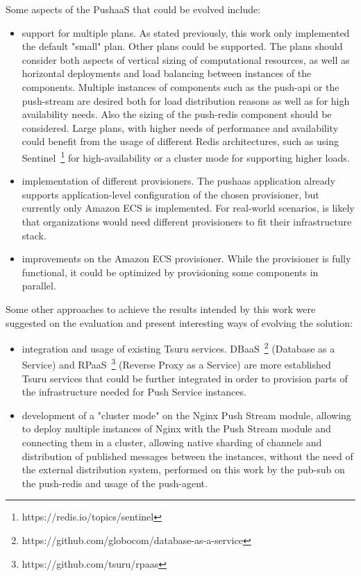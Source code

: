 Some aspects of the PushaaS that could be evolved include:
\begin{itemize}
    \item support for multiple plans. As stated previously, this work only implemented the default "small" plan. Other plans could be supported. The plans should consider both aspects of vertical sizing of computational resources, as well as horizontal deployments and load balancing between instances of the components. Multiple instances of components such as the push-api or the push-stream are desired both for load distribution reasons as well as for high availability needs. Also the sizing of the push-redis component should be considered. Large plans, with higher needs of performance and availability could benefit from the usage of different Redis architectures, such as using Sentinel~\footnote{https://redis.io/topics/sentinel} for high-availability or a cluster mode for supporting higher loads.
    \item implementation of different provisioners. The pushaas application already supports application-level configuration of the chosen provisioner, but currently only Amazon ECS is implemented. For real-world scenarios, is likely that organizations would need different provisioners to fit their infrastructure stack.
    \item improvements on the Amazon ECS provisioner. While the provisioner is fully functional, it could be optimized by provisioning some components in parallel.
\end{itemize}

Some other approaches to achieve the results intended by this work were suggested on the evaluation and present interesting ways of evolving the solution:
\begin{itemize}
    \item integration and usage of existing Tsuru services. DBaaS~\footnote{https://github.com/globocom/database-as-a-service} (Database as a Service) and RPaaS~\footnote{https://github.com/tsuru/rpaas} (Reverse Proxy as a Service) are more established Tsuru services that could be further integrated in order to provision parts of the infrastructure needed for Push Service instances.
    \item development of a "cluster mode" on the Nginx Push Stream module, allowing to deploy multiple instances of Nginx with the Push Stream module and connecting them in a cluster, allowing native sharding of channels and distribution of published messages between the instances, without the need of the external distribution system, performed on this work by the pub-sub on the push-redis and usage of the push-agent.
\end{itemize}
